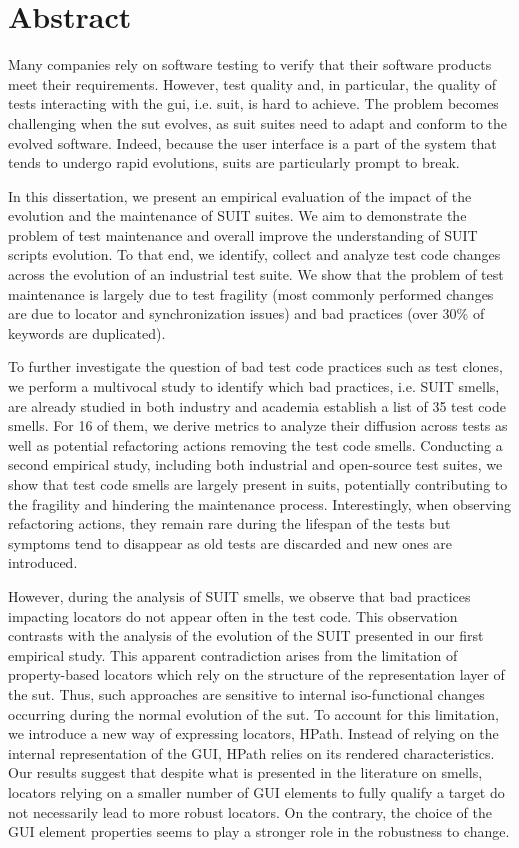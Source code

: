 \chapter*{Abstract}

Many companies rely on software testing to verify that their software products meet their requirements. However, test quality and, in particular, the quality of tests interacting with the \gls{gui}, i.e. \gls{suit}, is hard to achieve. The problem becomes challenging when the \gls{sut} evolves, as \gls{suit} suites need to adapt and conform to the evolved software. Indeed, because the user interface is a part of the system that tends to undergo rapid evolutions, \gls{suit}s are particularly prompt to break.

In this dissertation, we present an empirical evaluation of the impact of the evolution and the maintenance of SUIT suites. We aim to demonstrate the problem of test maintenance and overall improve the understanding of SUIT scripts evolution. To that end, we identify, collect and analyze test code changes across the evolution of an industrial test suite. We show that the problem of test maintenance is largely due to test fragility (most commonly performed changes are due to locator and synchronization issues) and bad practices (over 30\% of keywords are duplicated). 

To further investigate the question of bad test code practices such as test clones, we perform a multivocal study to identify which bad practices, i.e. SUIT smells, are already studied in both industry and academia establish a list of 35 test code smells. For 16 of them, we derive metrics to analyze their diffusion across tests as well as potential refactoring actions removing the test code smells. Conducting a second empirical study, including both industrial and open-source test suites, we show that test code smells are largely present in \gls{suit}s, potentially contributing to the fragility and hindering the maintenance process. Interestingly, when observing refactoring actions, they remain rare during the lifespan of the tests but symptoms tend to disappear as old tests are discarded and new ones are introduced.

However, during the analysis of SUIT smells, we observe that bad practices impacting locators do not appear often in the test code. This observation contrasts with the analysis of the evolution of the SUIT presented in our first empirical study.  This apparent contradiction arises from the limitation of property-based locators which rely on the structure of the representation layer of the \gls{sut}. Thus, such approaches are sensitive to internal iso-functional changes occurring during the normal evolution of the \gls{sut}. To account for this limitation, we introduce a new way of expressing locators, HPath. Instead of relying on the internal representation of the GUI, HPath relies on its rendered characteristics. Our results suggest that despite what is presented in the literature on smells, locators relying on a smaller number of GUI elements to fully qualify a target do not necessarily lead to more robust locators. On the contrary, the choice of the GUI element properties seems to play a stronger role in the robustness to change.

